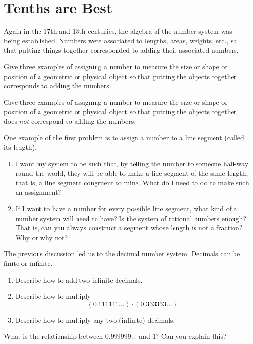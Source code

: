 \newpage
\section{Tenths are Best}

Again in the 17th and 18th centuries, the algebra of the number system
was being established.  Numbers were associated to lengths, areas,
weights, etc., so that putting things together corresponded to adding
their associated numbers.

\begin{prob}
Give three examples of assigning a number to measure the size or shape
or position of a geometric or physical object so that putting the
objects together corresponds to adding the numbers.
\end{prob}


\begin{prob}
Give three examples of assigning a number to measure the size or shape
or position of a geometric or physical object so that putting the
objects together does \textit{not} correspond to adding the numbers.
\end{prob}

\begin{prob}
One example of the first problem is to assign a number to a line
segment (called its length).  
\begin{enumerate}
\item I want my system to be such that, by telling the number to someone half-way round the world, they will be able to make a line segment of the same length, that is, a line segment congruent to mine.  What do I need to do to make such an
assignment?
\item If I want to have a number for every possible line
segment, what kind of a number system will need to have?  Is the
system of rational numbers enough? That is, can you always construct a
segment whose length is not a fraction?  Why or why not?
\end{enumerate}
\end{prob}

\begin{prob}
The previous discussion led us to the decimal number system.  Decimals can be finite or infinite.
\begin{enumerate}
\item Describe how to add two infinite decimals.
\item Describe how to multiply 
\[
(0.111111\dots)\cdot (0.333333\dots)
\]
\item Describe how to multiply any two (infinite) decimals.
\end{enumerate}
\end{prob}


\begin{prob}
What is the relationship between $0.999999\dots$ and $1$? Can you
explain this?
\end{prob}
